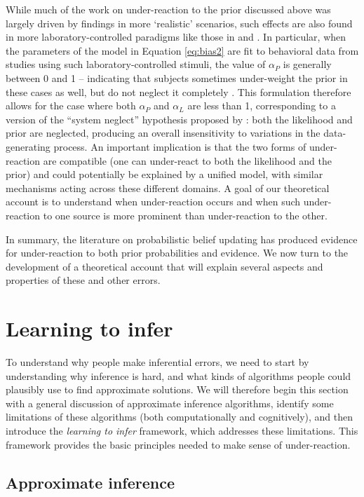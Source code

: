 While much of the work on under-reaction to the prior discussed above was largely driven by findings in more `realistic' scenarios, such effects are also found in more laboratory-controlled paradigms like those in \citet{peterson1964mode} and \citet{edwards1968conservatism}. In particular, when the parameters of the model in Equation \ref{eq:bias2} are fit to behavioral data from studies using such laboratory-controlled stimuli, the value of $\alpha_P$ is generally between 0 and 1 -- indicating that subjects sometimes under-weight the prior in these cases as well, but do not neglect it completely \citep{benjamin18}. This formulation therefore allows for the case where both $\alpha_P$ and $\alpha_L$ are less than 1, corresponding to a version of the ``system neglect'' hypothesis proposed by \citet{massey2005detecting}: both the likelihood and prior are neglected, producing an overall insensitivity to variations in the data-generating process. An important implication is that the two forms of under-reaction are compatible (one can under-react to both the likelihood and the prior) and could potentially be explained by a unified model, with similar mechanisms acting across these different domains. A goal of our theoretical account is to understand when under-reaction occurs and when such under-reaction to one source is more prominent than under-reaction to the other.

In summary, the literature on probabilistic belief updating has produced evidence for under-reaction to both prior probabilities and evidence. We now turn to the development of a theoretical account that will explain several aspects and properties of these and other errors.

\section{Learning to infer}

To understand why people make inferential errors, we need to start by understanding why inference is hard, and what kinds of algorithms people could plausibly use to find approximate solutions. We will therefore begin this section with a general discussion of approximate inference algorithms, identify some limitations of these algorithms (both computationally and cognitively), and then introduce the \emph{learning to infer} framework, which addresses these limitations. This framework provides the basic principles needed to make sense of under-reaction.

\subsection{Approximate inference}

